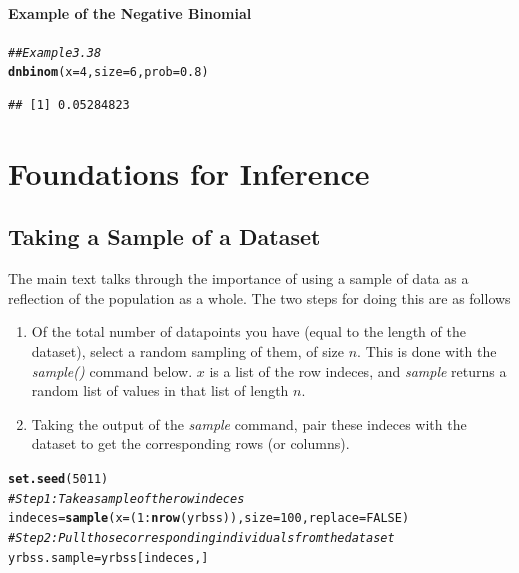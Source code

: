 \documentclass{report}\usepackage[]{graphicx}\usepackage[]{color}
\makeatletter
\newcommand{\hlnum}[1]{\textcolor[rgb]{0.686,0.059,0.569}{#1}}%
\newcommand{\hlcom}[1]{\textcolor[rgb]{0.678,0.584,0.686}{\textit{#1}}}%
\newcommand{\hlopt}[1]{\textcolor[rgb]{0,0,0}{#1}}%
\newcommand{\hlstd}[1]{\textcolor[rgb]{0.345,0.345,0.345}{#1}}%
\newcommand{\hlkwb}[1]{\textcolor[rgb]{0.69,0.353,0.396}{#1}}%
\newcommand{\hlkwc}[1]{\textcolor[rgb]{0.333,0.667,0.333}{#1}}%
\newcommand{\hlkwd}[1]{\textcolor[rgb]{0.737,0.353,0.396}{\textbf{#1}}}%
\newenvironment{kframe}{%
 \def\at@end@of@kframe{}%
 \ifinner\ifhmode%
  \def\at@end@of@kframe{\end{minipage}}%
  \begin{minipage}{\columnwidth}%
 \fi\fi%
 \def\FrameCommand##1{\hskip\@totalleftmargin \hskip-\fboxsep
 \colorbox{shadecolor}{##1}\hskip-\fboxsep
     \hskip-\linewidth \hskip-\@totalleftmargin \hskip\columnwidth}%
 \MakeFramed {\advance\hsize-\width
   \@totalleftmargin\z@ \linewidth\hsize
   \@setminipage}}%
 {\par\unskip\endMakeFramed%
 \at@end@of@kframe}
\newenvironment{knitrout}{}{} %
\makeatother
\begin{document}
\subsubsection{Example of the Negative Binomial}

\begin{knitrout}
\color{fgcolor}\begin{kframe}
\begin{alltt}
\hlcom{## Example 3.38 }
\hlkwd{dnbinom}\hlstd{(}\hlkwc{x} \hlstd{=} \hlnum{4}\hlstd{,} \hlkwc{size} \hlstd{=} \hlnum{6}\hlstd{,} \hlkwc{prob} \hlstd{=} \hlnum{0.8}\hlstd{)}
\end{alltt}
\begin{verbatim}
## [1] 0.05284823
\end{verbatim}
\end{kframe}
\end{knitrout}


\newpage
\chapter{Foundations for Inference}
\minitoc

\vspace{0.5cm} 

\section{Taking a Sample of a Dataset}
The main text talks through the importance of using a sample of data as a reflection of the population as a whole.  The two steps for doing this are as follows
\begin{enumerate}
\item Of the total number of datapoints you have (equal to the length of the dataset), select a random sampling of them, of size $n$.  This is done with the \textit{sample()} command below.  $x$ is a list of the row indeces, and \textit{sample} returns a random list of values in that list of length $n$. 
\item Taking the output of the \textit{sample} command, pair these indeces with the dataset to get the corresponding rows (or columns).  
\end{enumerate}

\begin{knitrout}
\color{fgcolor}\begin{kframe}
\begin{alltt}
\hlkwd{set.seed}\hlstd{(}\hlnum{5011}\hlstd{)}
\hlcom{# Step 1: Take a sample of the row indeces }
\hlstd{indeces} \hlkwb{=} \hlkwd{sample}\hlstd{(}\hlkwc{x} \hlstd{= (}\hlnum{1}\hlopt{:}\hlkwd{nrow}\hlstd{(yrbss)),} \hlkwc{size} \hlstd{=} \hlnum{100}\hlstd{,} \hlkwc{replace} \hlstd{=} \hlnum{FALSE}\hlstd{)}
\hlcom{# Step 2: Pull those corresponding individuals from the dataset }
\hlstd{yrbss.sample} \hlkwb{=} \hlstd{yrbss[indeces,]}
\end{alltt}
\end{kframe}
\end{knitrout}
\end{document}

